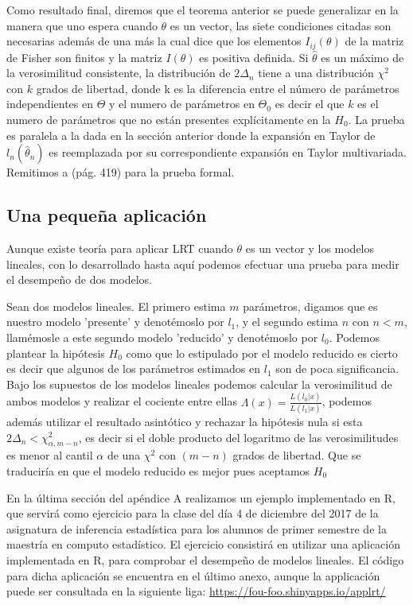 \documentclass[peerreview]{IEEEtran}
\begin{document}
Como resultado final, diremos que el teorema anterior se puede generalizar en la manera que uno espera cuando $\theta$ es un vector, las siete condiciones citadas son necesarias además de una más la cual dice que los elementos $I_{ij}(\theta)$ de la matriz de Fisher son finitos y la matriz $I(\theta)$ es positiva definida.  Si $\hat{\theta}$ es un máximo de la verosimilitud consistente, la distribución de $2\Delta_n$ tiene a una distribución $\chi^2$ con $k$ grados de libertad, donde k es la diferencia entre el número de parámetros independientes en $\Theta$ y el numero de parámetros en $\Theta_0$ es decir el que $k$ es el numero de parámetros que no están presentes explícitamente en la $H_0$. La prueba es paralela a la dada en la sección anterior donde la expansión en Taylor de $l_n(\hat{\theta}_n)$ es reemplazada por su correspondiente expansión en Taylor multivariada. Remitimos a \cite{Wilks} (pág. 419) para la prueba formal.   
\subsection{Una pequeña aplicación}
Aunque existe teoría para aplicar LRT cuando $\theta$ es un vector y los modelos lineales, con lo desarrollado hasta aquí podemos efectuar una prueba para medir el desempeño de dos modelos.

Sean dos modelos lineales. El primero estima $m$ parámetros, digamos que es nuestro modelo 'presente' y denotémoslo por $l_1$, y el segundo estima $n$ con $n<m$, llamémosle a este segundo modelo 'reducido' y denotémoslo por $l_0$.
Podemos plantear la hipótesis $H_0$ como que lo estipulado por el modelo reducido es cierto es decir que algunos de los parámetros estimados en $l_1$ son de poca significancia.
Bajo los supuestos de los modelos lineales podemos calcular la verosimilitud de ambos modelos y realizar el cociente entre ellas $\Lambda(x) = \frac{L( l_0|x)}{L(l_1|x)}$, podemos además utilizar el resultado asintótico y rechazar la hipótesis nula si esta $2\Delta_n < \chi^2_{\alpha,m-n}$, es decir si el doble producto del logaritmo de las verosimilitudes es menor al cantil $\alpha$ de una $\chi^2$ con $(m-n)$ grados de libertad. Que se traduciría en que el modelo reducido es mejor pues aceptamos $H_0$ 

En la última sección del apéndice A realizamos un ejemplo implementado en R, que servirá como ejercicio para la clase del día 4 de diciembre del 2017 de la asignatura de inferencia estadística para los alumnos de primer semestre de la maestría en computo estadístico. El ejercicio consistirá en utilizar una aplicación implementada en R, para comprobar el desempeño de modelos lineales. El código para dicha aplicación se encuentra en el último anexo, aunque la applicación puede ser consultada en la siguiente liga: \url{https://fou-foo.shinyapps.io/applrt/}
\end{document}

